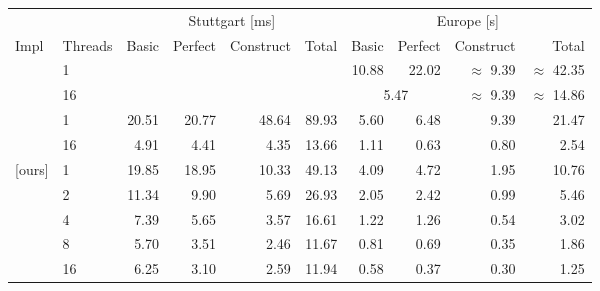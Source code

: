 \begin{tabular}{llrrrrrrrr}
\toprule
& & \multicolumn{4}{c}{Stuttgart [ms]} & \multicolumn{4}{c}{Europe [s]} \\ \cmidrule(lr){3-6} \cmidrule(lr){7-10}
Impl & Threads &     Basic & Perfect & Construct &  Total &  Basic & Perfect & Construct &  Total \\
\midrule
\cite{DibbeltSW16}
& 1           &           &         &           &        &  10.88 &   22.02 & $\approx$ 9.39 & $\approx$ 42.35 \\
& 16          &           &         &           &        & \multicolumn{2}{c}{5.47} & $\approx$ 9.39 & $\approx$ 14.86 \\
\addlinespace
\cite{BuchholdSW19}
& 1           &     20.51 &   20.77 &     48.64 &  89.93 &   5.60 &    6.48 &      9.39 &  21.47 \\
& 16          &      4.91 &    4.41 &      4.35 &  13.66 &   1.11 &    0.63 &      0.80 &   2.54 \\
\addlinespace
{[ours]}
& 1           &     19.85 &   18.95 &     10.33 &  49.13 &   4.09 &    4.72 &      1.95 &  10.76 \\
& 2           &     11.34 &    9.90 &      5.69 &  26.93 &   2.05 &    2.42 &      0.99 &   5.46 \\
& 4           &      7.39 &    5.65 &      3.57 &  16.61 &   1.22 &    1.26 &      0.54 &   3.02 \\
& 8           &      5.70 &    3.51 &      2.46 &  11.67 &   0.81 &    0.69 &      0.35 &   1.86 \\
& 16          &      6.25 &    3.10 &      2.59 &  11.94 &   0.58 &    0.37 &      0.30 &   1.25 \\
\bottomrule
\end{tabular}

